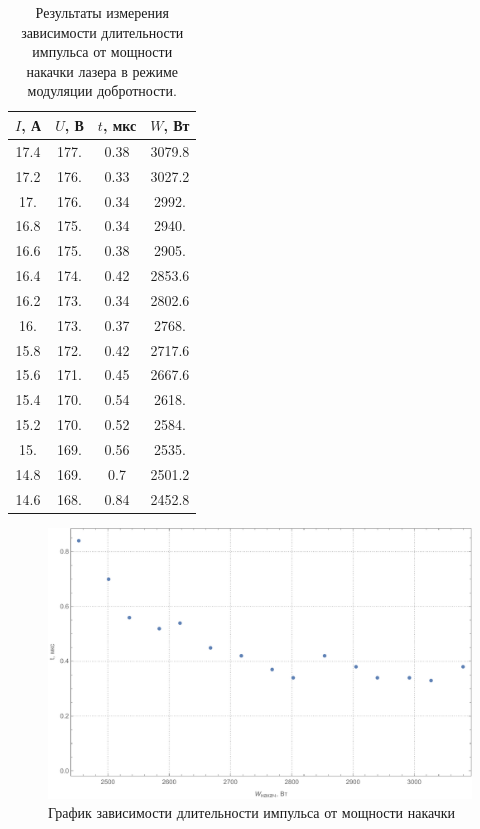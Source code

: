 \documentclass[a4paper, 12pt]{article}
\begin{document}
\begin{table}[!htb]
	\centering
	\caption{Результаты измерения зависимости длительности импульса от мощности накачки лазера в режиме модуляции добротности.}
	\begin{tabular}{|c|c|c|c|}
		\hline
		$I$, А & $U$, В & $t$, мкс & $W$, Вт\\
		\hline
		17.4 & 177. & 0.38 & 3079.8 \\
 17.2 & 176. & 0.33 & 3027.2 \\
 17. & 176. & 0.34 & 2992. \\
 16.8 & 175. & 0.34 & 2940. \\
 16.6 & 175. & 0.38 & 2905. \\
 16.4 & 174. & 0.42 & 2853.6 \\
 16.2 & 173. & 0.34 & 2802.6 \\
 16. & 173. & 0.37 & 2768. \\
 15.8 & 172. & 0.42 & 2717.6 \\
 15.6 & 171. & 0.45 & 2667.6 \\
 15.4 & 170. & 0.54 & 2618. \\
 15.2 & 170. & 0.52 & 2584. \\
 15. & 169. & 0.56 & 2535. \\
 14.8 & 169. & 0.7 & 2501.2 \\
 14.6 & 168. & 0.84 & 2452.8 \\
 \hline
	\end{tabular}
\end{table}
\begin{figure}[!htb]
	\centering
	\includegraphics[width=\textwidth]{3.pdf}
	\caption{График зависимости длительности импульса от мощности накачки}
\end{figure}
\end{document}

